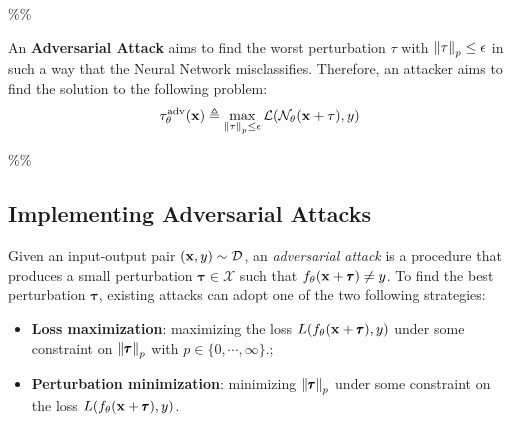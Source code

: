 \%\%

An \textbf{Adversarial Attack} aims to find the worst perturbation $\tau$ with $\norm{\tau}_p \leq \epsilon$ in such a way that the Neural Network misclassifies. Therefore, an attacker aims to find the solution to the following problem:
\begin{equation}
  \tau_{\theta}^{\mathrm{adv}}(\mathbf{x}) \triangleq \max_{\norm{\tau}_p \leq \epsilon} \mathcal{L}(\mathcal{N}_\theta(\mathbf{x} + \tau), y)
\end{equation}

\%\%




\subsection{Implementing Adversarial Attacks}
\label{subsection:ch2-adversarial_attacks}
 
Given an input-output pair $(\mathbf{x}, y) \sim \mathcal{D}$, an \emph{adversarial attack} is a procedure that produces a small perturbation $\pmb{\tau} \in  \mathcal X$  such that $f_\theta(\mathbf{x} + \pmb{\tau}) \neq y$.
To find the best perturbation $\pmb{\tau}$, existing attacks can adopt one of the two following strategies:
\begin{itemize}
  \item \textbf{Loss maximization}: maximizing the loss $L(f_\theta(\mathbf{x} + \pmb{\tau}), y)$ under some constraint on $\norm{\pmb{\tau}}_p$ with $p \in \{0, \cdots, \infty\}$.;
  \item \textbf{Perturbation minimization}: minimizing $\norm{\pmb{\tau}}_p$ under some constraint on the loss $L(f_\theta(\mathbf{x} + \pmb{\tau}), y)$.
\end{itemize}

